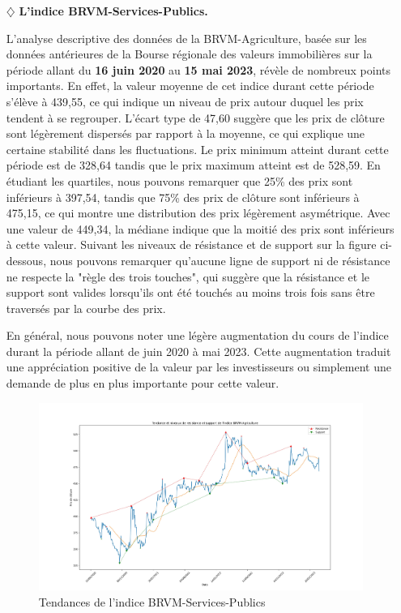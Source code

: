 \begin{itemize}
    \item[$\diamondsuit$]\textbf{L'indice BRVM-Services-Publics.}    
    \par{L'analyse descriptive des données de la BRVM-Agriculture, basée sur les données 
        antérieures de la Bourse régionale des valeurs immobilières sur la période allant du 
        \textbf{16 juin 2020} au \textbf{15 mai 2023}, révèle de nombreux points importants.
        En effet, la valeur moyenne de cet indice durant cette période s'élève à 439,55, ce qui 
        indique un niveau de prix autour duquel les prix tendent à se regrouper. L'écart type 
        de 47,60 suggère que les prix de clôture sont légèrement dispersés par rapport à la moyenne, 
        ce qui explique une certaine stabilité dans les fluctuations. Le prix minimum atteint durant 
        cette période est de 328,64 tandis que le prix maximum atteint est de 528,59. En étudiant les quartiles,
        nous pouvons remarquer que 25\% des prix sont inférieurs à 397,54, tandis que 75\% des prix de clôture
        sont inférieurs à 475,15, ce qui montre une distribution des prix légèrement asymétrique. 
        Avec une valeur de 449,34, la médiane indique que la moitié des prix sont inférieurs à cette valeur.
        Suivant les niveaux de résistance et de support sur la figure ci-dessous, nous pouvons remarquer qu'aucune ligne
        de support ni de résistance ne respecte la "règle des trois touches", qui suggère que la résistance et le 
        support sont valides lorsqu'ils ont été touchés au moins trois fois sans être traversés 
        par la courbe des prix.}
        \par{
        En général, nous pouvons noter une légère augmentation du cours de l'indice durant la période
        allant de juin 2020 à mai 2023. Cette augmentation traduit une appréciation positive de la valeur
        par les investisseurs ou simplement une demande de plus en plus importante pour cette valeur.}
        
        \begin{figure}[h]
            \centering
            \includegraphics[width=1 \textwidth ]{img/public_tendance.jpg}
            \caption{Tendances de l'indice BRVM-Services-Publics}
            \label{fig:Tendances de l'indice BRVM-Services-Publics}
          \end{figure}


\end{itemize}
